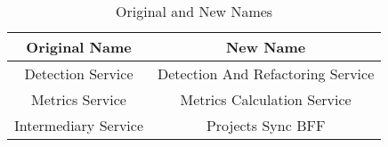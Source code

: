 \begin{table}[h]
    \centering
    \caption{Original and New Names}
\begin{tabular}{c c}
        \toprule
        \textbf{Original Name} & \textbf{New Name} \\
        \midrule
        Detection Service & Detection And Refactoring Service \\
        Metrics Service & Metrics Calculation Service \\
        Intermediary Service & Projects Sync BFF \\
        \bottomrule
    \end{tabular}
    \label{tab-services-map}
\end{table}